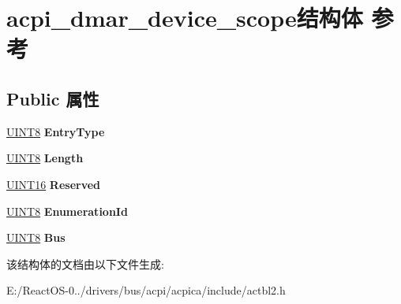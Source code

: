 \hypertarget{structacpi__dmar__device__scope}{}\section{acpi\+\_\+dmar\+\_\+device\+\_\+scope结构体 参考}
\label{structacpi__dmar__device__scope}
\subsection*{Public 属性}
\begin{DoxyCompactItemize}
\item 
\mbox{\label{structacpi__dmar__device__scope_ad7fecc3ec04e31de9e5908b899ee033d}} 
\hyperlink{_processor_bind_8h_ab27e9918b538ce9d8ca692479b375b6a}{U\+I\+N\+T8} {\bfseries Entry\+Type}
\item 
\mbox{\label{structacpi__dmar__device__scope_a86928e054744c0272bc95638c8e69376}} 
\hyperlink{_processor_bind_8h_ab27e9918b538ce9d8ca692479b375b6a}{U\+I\+N\+T8} {\bfseries Length}
\item 
\mbox{\label{structacpi__dmar__device__scope_a2d426ed972be888011da0764c060cd45}} 
\hyperlink{_processor_bind_8h_a09f1a1fb2293e33483cc8d44aefb1eb1}{U\+I\+N\+T16} {\bfseries Reserved}
\item 
\mbox{\label{structacpi__dmar__device__scope_a018439afb36201bb55ab8a2a3e4d783b}} 
\hyperlink{_processor_bind_8h_ab27e9918b538ce9d8ca692479b375b6a}{U\+I\+N\+T8} {\bfseries Enumeration\+Id}
\item 
\mbox{\label{structacpi__dmar__device__scope_a1e0a4f4cb342f5595bd8aeafad617f17}} 
\hyperlink{_processor_bind_8h_ab27e9918b538ce9d8ca692479b375b6a}{U\+I\+N\+T8} {\bfseries Bus}
\end{DoxyCompactItemize}


该结构体的文档由以下文件生成\+:\begin{DoxyCompactItemize}
\item 
E\+:/\+React\+O\+S-\/0../drivers/bus/acpi/acpica/include/actbl2.\+h\end{DoxyCompactItemize}
